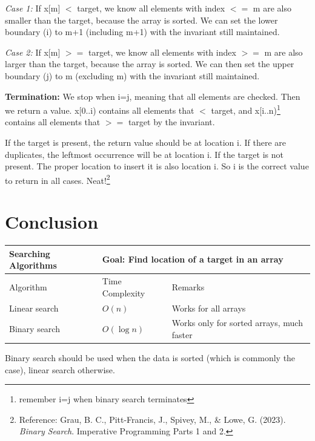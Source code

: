\textit{Case 1:} If x[m] $<$ target, we know all elements with index $<=$ m are also smaller than the target, because the array is sorted. We can set the lower boundary (i) to m+1 (including m+1) with the invariant still maintained.

\textit{Case 2:} If x[m] $>=$ target, we know all elements with index $>=$ m are also larger than the target, because the array is sorted. We can then set the upper boundary (j) to m (excluding m) with the invariant still maintained.
\vspace{6mm}

\textbf{Termination:} We stop when i=j, meaning that all elements are checked. Then we return a value. x[0..i) contains all elements that $<$ target, and x[i..n)\footnote{remember i=j when binary search terminates} contains all elements that $>=$ target by the invariant. 

If the target is present, the return value should be at location i. If there are duplicates, the leftmost occurrence will be at location i. If the target is not present. The proper location to insert it is also location i. So i is the correct value to return in all cases. Neat!\footnote{Reference: Grau, B. C., Pitt-Francis, J., Spivey, M., \& Lowe, G. (2023). \textit{Binary Search}. Imperative Programming Parts 1 and 2.}
\vspace{6mm}

\fi

\section{Conclusion}

\begin{table}[h]
    \centering
    \begin{tabular}{|m{6em}|m{9em}|m{18em}|}
        \hline  
        \textbf{Searching Algorithms} & 
        \multicolumn{2}{l|}{Goal: Find location of a target in an array}
        \\ \hline \hline
        
        Algorithm &
        Time Complexity & 
        Remarks
        \\ \hline \hline
        
        Linear search &
        $O(n)$ &
        Works for all arrays
        \\ \hline
        
        Binary search &
        $O(\log n)$ &
        Works only for sorted arrays, much faster
        \\ \hline
    \end{tabular}
\end{table}

Binary search should be used when the data is sorted (which is commonly the case), linear search otherwise.